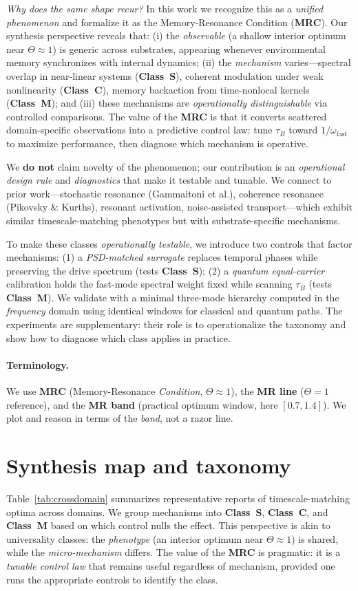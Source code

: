 \documentclass[11pt,letterpaper]{article}
\DeclareRobustCommand{\mrc}{\textbf{MRC}\xspace}
\DeclareRobustCommand{\classS}{\textbf{Class~S}\xspace}
\DeclareRobustCommand{\classC}{\textbf{Class~C}\xspace}
\DeclareRobustCommand{\classM}{\textbf{Class~M}\xspace}
\begin{document}
\emph{Why does the same shape recur?} In this work we recognize this as a \emph{unified phenomenon} and formalize it as the Memory-Resonance Condition (\mrc). Our synthesis perspective reveals that: (i) the \emph{observable} (a shallow interior optimum near $\Theta\!\approx\!1$) is generic across substrates, appearing whenever environmental memory synchronizes with internal dynamics; (ii) the \emph{mechanism} varies---spectral overlap in near-linear systems (\classS), coherent modulation under weak nonlinearity (\classC), memory backaction from time-nonlocal kernels (\classM); and (iii) these mechanisms are \emph{operationally distinguishable} via controlled comparisons. The value of the \mrc is that it converts scattered domain-specific observations into a predictive control law: tune $\tau_B$ toward $1/\omega_{\mathrm{fast}}$ to maximize performance, then diagnose which mechanism is operative.

We \textbf{do not} claim novelty of the phenomenon; our contribution is an \emph{operational design rule} and \emph{diagnostics} that make it testable and tunable. We connect to prior work---stochastic resonance (Gammaitoni et al.), coherence resonance (Pikovsky \& Kurths), resonant activation, noise-assisted transport---which exhibit similar timescale-matching phenotypes but with substrate-specific mechanisms.

To make these classes \emph{operationally testable}, we introduce two controls that factor mechanisms: (1) a \emph{PSD-matched surrogate} replaces temporal phases while preserving the drive spectrum (tests \classS); (2) a \emph{quantum equal-carrier} calibration holds the fast-mode spectral weight fixed while scanning $\tau_B$ (tests \classM). We validate with a minimal three-mode hierarchy computed in the \emph{frequency} domain using identical windows for classical and quantum paths. The experiments are supplementary: their role is to operationalize the taxonomy and show how to diagnose which class applies in practice.

\paragraph*{Terminology.} We use \textbf{MRC} (Memory-Resonance \emph{Condition}, $\Theta\!\approx\!1$), the \textbf{MR line} ($\Theta=1$ reference), and the \textbf{MR band} (practical optimum window, here $[0.7,1.4]$). We plot and reason in terms of the \emph{band}, not a razor line.

\section{Synthesis map and taxonomy}
Table~\ref{tab:crossdomain} summarizes representative reports of timescale-matching optima across domains. We group mechanisms into \classS{}, \classC{}, and \classM{} based on which control nulls the effect. This perspective is akin to universality classes: the \emph{phenotype} (an interior optimum near $\Theta\!\approx\!1$) is shared, while the \emph{micro-mechanism} differs. The value of the \mrc is pragmatic: it is a \emph{tunable control law} that remains useful regardless of mechanism, provided one runs the appropriate controls to identify the class.
\end{document}
